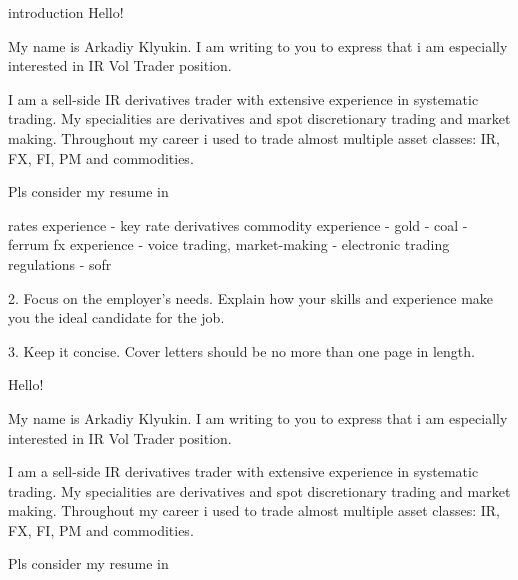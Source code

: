 \documentclass[a4paper,hidelinks]{article}
\makeatletter
\newcommand{\resumeSubheading}[4]{
  \vspace{-2pt}\item
    \begin{tabular*}{0.97\textwidth}[t]{l@{\extracolsep{\fill}}r}
      \textbf{#1} & #2 \\
      \text{\small#3} & \text{\small #4} \\
    \end{tabular*}\vspace{-7pt}
}
\newcommand{\resumeSubHeadingListStart}{\begin{itemize}[leftmargin=0.15in, label={}]}
\makeatother
\begin{document}
introduction 
Hello!

My name is Arkadiy Klyukin. I am writing to you to express that i am especially interested in IR Vol Trader position.

I am a sell-side IR derivatives trader with extensive experience in systematic trading. My specialities are derivatives and spot discretionary trading and market making. Throughout my career i used to trade almost multiple asset classes: IR, FX, FI, PM and commodities.

Pls consider my resume in 

rates experience 
- key rate derivatives 
commodity experience
- gold 
- coal 
- ferrum
fx experience
- voice trading, market-making
- electronic trading 
regulations 
- sofr

2. Focus on the employer's needs. Explain how your skills and experience make you the ideal candidate for the job.

3. Keep it concise. Cover letters should be no more than one page in length.


Hello!

My name is Arkadiy Klyukin. I am writing to you to express that i am especially interested in IR Vol Trader position.

I am a sell-side IR derivatives trader with extensive experience in systematic trading. My specialities are derivatives and spot discretionary trading and market making. Throughout my career i used to trade almost multiple asset classes: IR, FX, FI, PM and commodities.

Pls consider my resume in 





\end{document}
